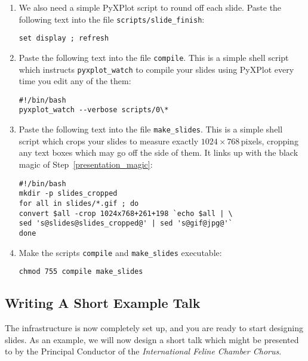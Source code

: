 \begin{enumerate}
\item We also need a simple PyXPlot script to round off each slide. Paste the
following text into the file {\tt scripts/slide\_finish}:
\begin{verbatim}
set display ; refresh
\end{verbatim}
\item Paste the following text into the file {\tt compile}. This is a simple
shell script which instructs {\tt pyxplot\_watch} to compile your slides using
PyXPlot every time you edit any of the them:
\begin{verbatim}
#!/bin/bash
pyxplot_watch --verbose scripts/0\*
\end{verbatim}
\item Paste the following text into the file {\tt make\_slides}. This is a
simple shell script which crops your slides to measure exactly
$1024\times768$\,pixels, cropping any text boxes which may go off the side of
them. It links up with the black magic of Step~\ref{presentation_magic}:
\begin{verbatim}
#!/bin/bash
mkdir -p slides_cropped
for all in slides/*.gif ; do
convert $all -crop 1024x768+261+198 `echo $all | \
sed 's@slides@slides_cropped@' | sed 's@gif@jpg@'`
done
\end{verbatim}
\item Make the scripts {\tt compile} and {\tt make\_slides} executable:
\begin{verbatim}
chmod 755 compile make_slides
\end{verbatim}
\end{enumerate}

\subsection{Writing A Short Example Talk} 

The infrastructure is now completely set up, and you are ready to start
designing slides. As an example, we will now design a short talk which might be
presented to by the Principal Conductor of the {\it International Feline
Chamber Chorus}.

